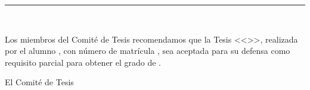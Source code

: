 {\renewcommand{\baselinestretch}{1.1}\selectfont
\hrule\vspace{0.5mm}

\begin{scshape}
\begin{center}
	\uanl\\
	\fcfm
\end{center}
\end{scshape}

Los miembros del Comité de Tesis recomendamos que la Tesis <<\titulo>>, realizada por el alumno \autor, con número de matrícula \matricula, sea aceptada para su defensa como requisito parcial para obtener el grado de \grado.
\ifdoctorado\vskip10mm\else\vskip8mm\fi

\begin{center}
El Comité de Tesis\\
\ifdoctorado\vskip15mm\else\vskip25mm\fi


\end{center}}
